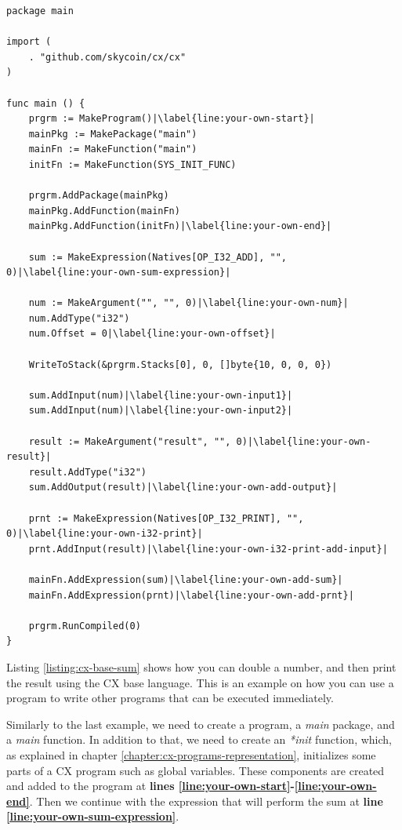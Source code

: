 \documentclass[11pt,fleqn,openany]{book} %
\begin{document}
\begin{lstlisting}[caption={Summing 10 + 10 using CX base language},captionpos=b,label={listing:cx-base-sum}]
package main

import (
	. "github.com/skycoin/cx/cx"
)

func main () {
	prgrm := MakeProgram()|\label{line:your-own-start}|
	mainPkg := MakePackage("main")
	mainFn := MakeFunction("main")
	initFn := MakeFunction(SYS_INIT_FUNC)

	prgrm.AddPackage(mainPkg)
	mainPkg.AddFunction(mainFn)
	mainPkg.AddFunction(initFn)|\label{line:your-own-end}|

	sum := MakeExpression(Natives[OP_I32_ADD], "", 0)|\label{line:your-own-sum-expression}|

	num := MakeArgument("", "", 0)|\label{line:your-own-num}|
	num.AddType("i32")
    num.Offset = 0|\label{line:your-own-offset}|

	WriteToStack(&prgrm.Stacks[0], 0, []byte{10, 0, 0, 0})

	sum.AddInput(num)|\label{line:your-own-input1}|
	sum.AddInput(num)|\label{line:your-own-input2}|

	result := MakeArgument("result", "", 0)|\label{line:your-own-result}|
	result.AddType("i32")
	sum.AddOutput(result)|\label{line:your-own-add-output}|
	
	prnt := MakeExpression(Natives[OP_I32_PRINT], "", 0)|\label{line:your-own-i32-print}|
	prnt.AddInput(result)|\label{line:your-own-i32-print-add-input}|

	mainFn.AddExpression(sum)|\label{line:your-own-add-sum}|
	mainFn.AddExpression(prnt)|\label{line:your-own-add-prnt}|

	prgrm.RunCompiled(0)
}
\end{lstlisting}

Listing \ref{listing:cx-base-sum} shows how you can double a number, and then print the result using the CX base language. This is an example on how you can use a program to write other programs that can be executed immediately.

Similarly to the last example, we need to create a program, a \emph{main} package, and a \emph{main} function. In addition to that, we need to create an \emph{*init} function, which, as explained in chapter \ref{chapter:cx-programs-representation}, initializes some parts of a CX program such as global variables. These components are created and added to the program at \textbf{lines \ref{line:your-own-start}-\ref{line:your-own-end}}. Then we continue with the expression that will perform the sum at \textbf{line \ref{line:your-own-sum-expression}}.
\end{document}
